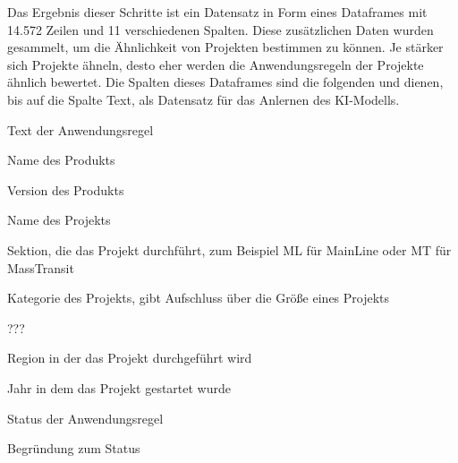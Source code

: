 Das Ergebnis dieser Schritte ist ein Datensatz in Form eines Dataframes mit 14.572 Zeilen und 11 verschiedenen Spalten. Diese zusätzlichen Daten wurden gesammelt, um die Ähnlichkeit von Projekten 
bestimmen zu können. Je stärker sich Projekte ähneln, desto eher werden die Anwendungsregeln der Projekte ähnlich bewertet. Die Spalten dieses Dataframes sind die folgenden und dienen, bis auf die 
Spalte \glqq Text\grqq{}, als Datensatz für das Anlernen des \ac{KI}-Modells.
\begin{description}[style=multiline,leftmargin=4cm,font=\bfseries, nolistsep]
    \item[Text] Text der Anwendungsregel
    \item[Product] Name des Produkts
    \item[ProductVersion] Version des Produkts
    \item[Project\_name] Name des Projekts
    \item[section] Sektion, die das Projekt durchführt, zum Beispiel ML für MainLine oder MT für MassTransit
    \item[Project\_category] Kategorie des Projekts, gibt Aufschluss über die Größe eines Projekts
    \item[BS] ???
    \item[RU] Region in der das Projekt durchgeführt wird
    \item[ProjectYear] Jahr in dem das Projekt gestartet wurde
    \item[Status] Status der Anwendungsregel
    \item[Statement] Begründung zum Status
\end{description} 

